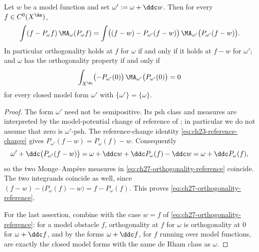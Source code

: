 \begin{proposition}
\label{prop:ch27-orthogonality-reference-change}
Let $w$ be a model function and set $\omega':=\omega+\ddc w$.  Then for
every $f\in C^0(X^{\An})$,
\begin{equation}\label{eq:ch27-orthogonality-reference}
 \int(f-P_\omega f)\,\MA_\omega(P_\omega f)
 =\int\bigl((f-w)-P_{\omega'}(f-w)\bigr)\,
   \MA_{\omega'}\bigl(P_{\omega'}(f-w)\bigr).
\end{equation}
In particular orthogonality holds at $f$ for $\omega$ if and only if it
holds at $f-w$ for $\omega'$; and $\omega$ has the orthogonality
property if and only if
\[
 \int_{X^{\An}}\bigl(-P_{\omega'}(0)\bigr)\,
   \MA_{\omega'}\bigl(P_{\omega'}(0)\bigr)=0
\]
for every closed model form $\omega'$ with $\{\omega'\}=\{\omega\}$.
\end{proposition}

\begin{proof}
The form $\omega'$ need not be semipositive.  Its psh class and measures
are interpreted by the model-potential change of reference of
; in particular we do not assume
that zero is $\omega'$-psh.
The reference-change identity \eqref{eq:ch23-reference-change} gives
$P_{\omega'}(f-w)=P_\omega(f)-w$.  Consequently
\[
 \omega'+\ddc\bigl(P_{\omega'}(f-w)\bigr)
 =\omega+\ddc w+\ddc P_\omega(f)-\ddc w
 =\omega+\ddc P_\omega(f),
\]
so the two Monge--Amp\`ere measures in
\eqref{eq:ch27-orthogonality-reference} coincide.  The two integrands
coincide as well, since
$(f-w)-\bigl(P_\omega(f)-w\bigr)=f-P_\omega(f)$.  This proves
\eqref{eq:ch27-orthogonality-reference}.

For the last assertion, combine
 with the case $w=f$ of
\eqref{eq:ch27-orthogonality-reference}: for a model obstacle $f$,
orthogonality at $f$ for $\omega$ is orthogonality at $0$ for
$\omega+\ddc f$, and by  the forms
$\omega+\ddc f$, for $f$ running over model functions, are exactly the
closed model forms with the same de Rham class as $\omega$.
\end{proof}

